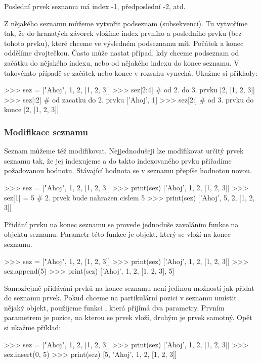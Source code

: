 Poslední prvek seznamu má index -1, předposlední -2, atd.

Z nějakého seznamu můžeme vytvořit podseznam (subsekvenci). Tu vytvoříme tak, že do hranatých závorek vložíme index prvního a posledního prvku (bez tohoto prvku), které chceme ve výsledném podseznamu mít. Počátek a konec oddělíme dvojtečkou. Často může nastat případ, kdy chceme podseznam od začátku do nějakého indexu, nebo od nějakého indexu do konce seznamu. V takovémto případě se začátek nebo konec v rozsahu vynechá. Ukažme si příklady:

\begin{python}
>>> sez = ["Ahoj", 1, 2, [1, 2, 3]]
>>> sez[2:4] # od 2. do 3. prvku
[2, [1, 2, 3]]
>>> sez[:2] # od zacatku do 2. prvku
['Ahoj', 1]
>>> sez[2:] # od 3. prvku do konce
[2, [1, 2, 3]]
\end{python}

\subsubsection{Modifikace seznamu}
Seznam můžeme též modifikovat. Nejjednodušeji lze modifikovat určitý prvek seznamu tak, že jej indexujeme a do takto indexovaného prvku přiřadíme požadovanou hodnotu. Stávající hodnota se v seznamu přepíše hodnotou novou.

\begin{python}
>>> sez = ["Ahoj", 1, 2, [1, 2, 3]]
>>> print(sez)
['Ahoj', 1, 2, [1, 2, 3]]
>>> sez[1] = 5 # 2. prvek bude nahrazen cislem 5
>>> print(sez)
['Ahoj', 5, 2, [1, 2, 3]]
\end{python}

Přidání prvku na konec seznamu se provede jednoduše zavoláním funk\-ce  na objektu seznamu. Parametr této funkce je objekt, který se vloží na konec seznamu.

\begin{python}
>>> sez = ["Ahoj", 1, 2, [1, 2, 3]]
>>> print(sez)
['Ahoj', 1, 2, [1, 2, 3]]
>>> sez.append(5)
>>> print(sez)
['Ahoj', 1, 2, [1, 2, 3], 5]
\end{python}

Samozřejmě přidávání prvků na konec seznamu není jedinou možností jak přidat do seznamu prvek. Pokud chceme na partikulární pozici v seznamu umístit nějaký objekt, použijeme funkci , která přijímá dva parametry. Prvním parametrem je pozice, na kterou se prvek vloží, druhým je prvek samotný. Opět si ukažme příklad:

\begin{python}
>>> sez = ["Ahoj", 1, 2, [1, 2, 3]]
>>> print(sez)
['Ahoj', 1, 2, [1, 2, 3]]
>>> sez.insert(0, 5)
>>> print(sez)
[5, 'Ahoj', 1, 2, [1, 2, 3]]
\end{python}

